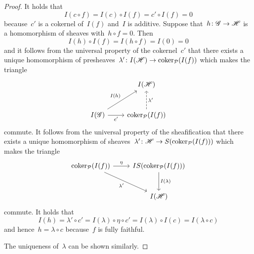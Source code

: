 \begin{example}
\begin{enumerate}
\begin{proof}
        It holds that
        \[
            I(c \circ f)
          = I(c) \circ I(f)
          = c' \circ I(f)
          = 0
        \]
        because~$c'$ is a cokernel of~$I(f)$ and~$I$ is additive.
        Suppose that~$h \colon \mathscr{G} \to \mathscr{H}$ is a homomorphism of sheaves with~$h \circ f = 0$.
        Then
        \[
          I(h) \circ I(f) = I(h \circ f) = I(0) = 0
        \]
        and it follows from the universal property of the cokernel~$c'$ that there exists a unique homomorphism of presheaves~$\lambda' \colon I(\mathscr{H}) \to \operatorname{coker}_{\mathcal{P}}(I(f))$ which makes the triangle
        \[
          \begin{tikzcd}[row sep = large]
              {}
            & I(\sheaf{H})
            \\
              I(\sheaf{G})
              \arrow{ur}[above left]{I(h)}
              \arrow{r}[below]{c'}
            & \coker_{\Pcat}(I(f))
              \arrow[dashed]{u}[right]{\lambda'}
          \end{tikzcd}
        \]
        commute. 
        It follows from the universal property of the sheafification that there exists a unique homomorphism of sheaves~$\lambda' \colon \mathscr{H} \to S(\operatorname{coker}_{\mathcal{P}}(I(f)))$ which makes the triangle
        \[
          \begin{tikzcd}[row sep = large]
              \coker_\Pcat(I(f))
              \arrow{r}[above]{\eta}
              \arrow{dr}[below left]{\lambda'}
            & IS(\coker_\Pcat(I(f)))
              \arrow{d}[right]{I(\lambda)}
            \\
              {}
            & I(\sheaf{H})
          \end{tikzcd}
        \]
        commute.
        It holds that
        \[
            I(h)
          = \lambda' \circ c'
          = I(\lambda) \circ \eta \circ c'
          = I(\lambda) \circ I(c)
          = I(\lambda \circ c)
        \]
        and hence~$h = \lambda \circ c$ because~$f$ is fully faithful.
        
        The uniqueness of~$\lambda$ can be shown similarly.
      \end{proof}
      

\end{enumerate}
\end{example}
